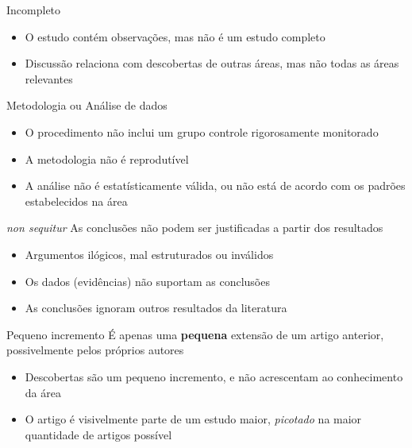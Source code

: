 \documentclass{beamer}
\begin{document}
\begin{frame}{Incompleto}
  \begin{itemize}
    \footnotesize
  \item O estudo contém observações, mas não é um estudo completo
    \bigskip
  \item Discussão relaciona com descobertas de outras áreas, mas não
    todas as áreas relevantes
  \end{itemize}
\end{frame}

\begin{frame}{Metodologia ou Análise de dados}
  \begin{itemize}
    \footnotesize
  \item O procedimento não inclui um grupo controle rigorosamente
    monitorado
    \bigskip
  \item A metodologia não é reprodutível
    \bigskip
  \item A análise não é estatísticamente válida, ou não está de acordo
    com os padrões estabelecidos na área
  \end{itemize}
\end{frame}

\begin{frame}{{\em non sequitur}}
  As conclusões não podem ser justificadas a partir dos resultados
  \begin{itemize}
    \footnotesize
  \item Argumentos ilógicos, mal estruturados ou inválidos
    \bigskip
  \item Os dados (evidências) não suportam as conclusões
    \bigskip
  \item As conclusões ignoram outros resultados da literatura
  \end{itemize}
\end{frame}

\begin{frame}{Pequeno incremento}
  É apenas uma {\bf pequena} extensão de um artigo anterior,
  possivelmente pelos próprios autores
  \begin{itemize}
    \footnotesize
  \item Descobertas são um pequeno incremento, e não acrescentam ao
    conhecimento da área
    \bigskip
  \item O artigo é visivelmente parte de um estudo maior, {\em
      picotado} na maior quantidade de artigos possível
  \end{itemize}
\end{frame}
\end{document}
